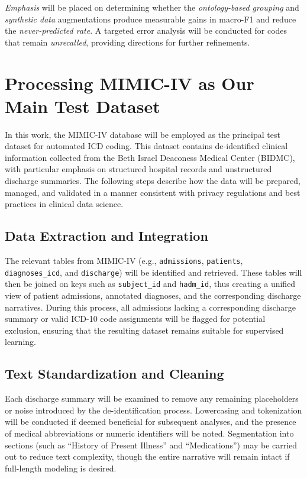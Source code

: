 \emph{Emphasis} will be placed on determining whether the \emph{ontology-based grouping} and \emph{synthetic data} augmentations produce measurable gains in macro-F1 and reduce the \emph{never-predicted rate}. A targeted error analysis will be conducted for codes that remain \emph{unrecalled}, providing directions for further refinements.

\section{Processing MIMIC-IV as Our Main Test Dataset}
\label{sec:processing_mimic_iv}

In this work, the MIMIC-IV database will be employed as the principal test dataset for automated ICD coding. This dataset contains de-identified clinical information collected from the Beth Israel Deaconess Medical Center (BIDMC), with particular emphasis on structured hospital records and unstructured discharge summaries. The following steps describe how the data will be prepared, managed, and validated in a manner consistent with privacy regulations and best practices in clinical data science.

\subsection{Data Extraction and Integration}
The relevant tables from MIMIC-IV (e.g., \texttt{admissions}, \texttt{patients}, \texttt{diagnoses\_icd}, and \texttt{discharge}) will be identified and retrieved. These tables will then be joined on keys such as \texttt{subject\_id} and \texttt{hadm\_id}, thus creating a unified view of patient admissions, annotated diagnoses, and the corresponding discharge narratives. During this process, all admissions lacking a corresponding discharge summary or valid ICD-10 code assignments will be flagged for potential exclusion, ensuring that the resulting dataset remains suitable for supervised learning.

\subsection{Text Standardization and Cleaning}
Each discharge summary will be examined to remove any remaining placeholders or noise introduced by the de-identification process. Lowercasing and tokenization will be conducted if deemed beneficial for subsequent analyses, and the presence of medical abbreviations or numeric identifiers will be noted. Segmentation into sections (such as “History of Present Illness” and “Medications”) may be carried out to reduce text complexity, though the entire narrative will remain intact if full-length modeling is desired.

